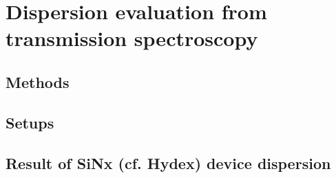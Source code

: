 
\chapter{Dispersion evaluation from transmission spectroscopy}
\section{Methods}
\section{Setups}
\section{Result of SiNx (cf. Hydex) device dispersion}
